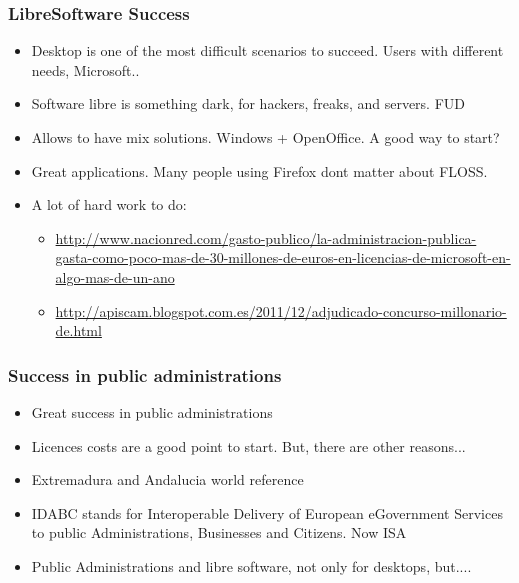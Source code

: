 \documentclass{beamer}
\begin{document}
\begin{frame}
\frametitle{LibreSoftware Success }

\begin{itemize}
\item Desktop is one of the most difficult scenarios to succeed. Users with different needs, Microsoft..
\item Software libre is something dark, for hackers, freaks, and servers. FUD
\item Allows to have mix solutions. Windows + OpenOffice. A good way to start?
\item Great applications. Many people using Firefox dont matter about FLOSS.
\item A lot of hard work to do: 
\begin{itemize}
 \item \url{http://www.nacionred.com/gasto-publico/la-administracion-publica-gasta-como-poco-mas-de-30-millones-de-euros-en-licencias-de-microsoft-en-algo-mas-de-un-ano}

 \item \url{http://apiscam.blogspot.com.es/2011/12/adjudicado-concurso-millonario-de.html}
\end{itemize}
\end{itemize}

\end{frame}




\begin{frame}
\frametitle{ Success in public administrations}

\begin{itemize}

\item Great success in public administrations
\item Licences costs are a good point to start. But, there are other reasons...
\item Extremadura and Andalucia world reference
\item IDABC stands for Interoperable Delivery of European eGovernment Services to public Administrations, Businesses and Citizens. Now ISA
\item Public Administrations and libre software, not only for desktops, but....

\end{itemize}

\end{frame}
\end{document}
